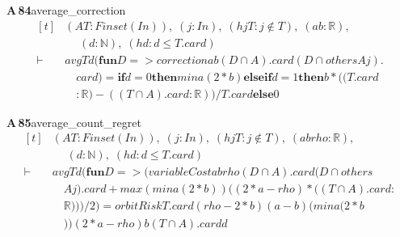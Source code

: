 \documentclass[conference]{IEEEtran}
\theoremstyle{definition}
\newcommand{\lean}[1]{\textsf{\footnotesize #1}}
\begin{document}
\noindent\textbf{A\,84}\quad\lean{average\_correction}
{\footnotesize\[ \begin{aligned}[t]
&(\mathit{A} \mathit{T} : \mathit{Finset} (\mathit{I} \mathit{n})),\; (\mathit{j} : \mathit{I} \mathit{n}),\; (\mathit{hjT} : \mathit{j} \notin \mathit{T}),\; (\mathit{a} \mathit{b} : \mathbb{R} ),\\
&\quad \; (\mathit{d} : \mathbb{N} ),\; (\mathit{hd} : \mathit{d} \leq \mathit{T}.\mathit{card})\\
\vdash\;&\mathit{avg} \mathit{T} \mathit{d} (\mathbf{fun} \mathit{D} => \mathit{correction} \mathit{a} \mathit{b} (\mathit{D} \cap \mathit{A}).\mathit{card} (\mathit{D} \cap \mathit{others} \mathit{A} \mathit{j}).\\
&\quad \mathit{card}) = \mathbf{if} \mathit{d}=0 \mathbf{then} \mathit{min} \mathit{a} (2*\mathit{b}) \mathbf{else} \mathbf{if} \mathit{d}=1 \mathbf{then} \mathit{b}*((\mathit{T}.\mathit{card}\\
&\quad :\mathbb{R} )-((\mathit{T} \cap \mathit{A}).\mathit{card}:\mathbb{R} ))/\mathit{T}.\mathit{card} \mathbf{else} 0
\end{aligned} \]}

\noindent\textbf{A\,85}\quad\lean{average\_count\_regret}
{\footnotesize\[ \begin{aligned}[t]
&(\mathit{A} \mathit{T} : \mathit{Finset} (\mathit{I} \mathit{n})),\; (\mathit{j} : \mathit{I} \mathit{n}),\; (\mathit{hjT} : \mathit{j} \notin \mathit{T}),\; (\mathit{a} \mathit{b} \mathit{rho} : \mathbb{R} ),\\
&\quad \; (\mathit{d} : \mathbb{N} ),\; (\mathit{hd} : \mathit{d} \leq \mathit{T}.\mathit{card})\\
\vdash\;&\mathit{avg} \mathit{T} \mathit{d} (\mathbf{fun} \mathit{D} => (\mathit{variableCost} \mathit{a} \mathit{b} \mathit{rho} (\mathit{D} \cap \mathit{A}).\mathit{card} (\mathit{D} \cap \mathit{others}\\
&\quad \mathit{A} \mathit{j}).\mathit{card}+ \mathit{max} (\mathit{min} \mathit{a} (2*\mathit{b})) ((2*\mathit{a}-\mathit{rho})*((\mathit{T} \cap \mathit{A}).\mathit{card}:\\
&\quad \mathbb{R} )))/2) = \mathit{orbitRisk} \mathit{T}.\mathit{card} (\mathit{rho}-2*\mathit{b}) (\mathit{a}-\mathit{b}) (\mathit{min} \mathit{a} (2*\mathit{b}\\
&\quad )) (2*\mathit{a}-\mathit{rho}) \mathit{b} (\mathit{T} \cap \mathit{A}).\mathit{card} \mathit{d}
\end{aligned} \]}
\end{document}
